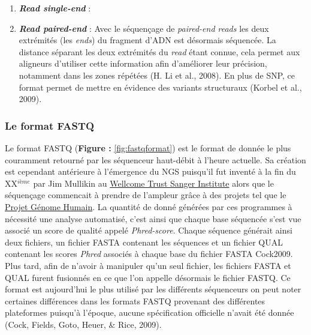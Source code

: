 \documentclass[12pt,twoside]{reedthesis}
\providecommand{\tightlist}{%
  \setlength{\itemsep}{0pt}\setlength{\parskip}{0pt}}
\theoremstyle{definition}
\theoremstyle{definition}
\theoremstyle{remark}
\begin{document}
  \begin{enumerate}
  \def\labelenumi{\arabic{enumi}.}
  \tightlist
  \item
    \textbf{\emph{Read single-end} }:\\
  \item
    \textbf{\emph{Read paired-end} }: Avec le séquençage de
    \emph{paired-end reads} les deux extrémités (les \emph{ends}) du
    fragment d'ADN est désormais séquencée. La distance séparant les deux
    extrémités du \emph{read} étant connue, cela permet aux aligneurs
    d'utiliser cette information afin d'améliorer leur précision,
    notamment dans les zones répétées (H. Li et al., 2008). En plus de
    SNP, ce format permet de mettre en évidence des variants structuraux
    (Korbel et al., 2009).
  \end{enumerate}
  
  \subsubsection{Le format FASTQ}\label{le-format-fastq}
  
  Le format FASTQ (\textbf{Figure : }\ref{fig:fastqformat}) est le format
  de donnée le plus couramment retourné par les séquenceur haut-débit à
  l'heure actuelle. Sa création est cependant antérieure à l'émergence du
  NGS puisqu'il fut inventé à la fin du XX\(^{ième}\) par Jim Mullikin au
  \href{https://fr.wikipedia.org/wiki/Wellcome_Trust_Sanger_Institute}{Wellcome
  Trust Sanger Institute} alors que le séquençage commencait à prendre de
  l'ampleur grâce à des projets tel que le
  \href{https://fr.wikipedia.org/wiki/Projet_G\%C3\%A9nome_Humain}{Projet
  Génome Humain}. La quantité de donné générées par ces programmes à
  nécessité une analyse automatisé, c'est ainsi que chaque base séquencée
  s'est vue associé un score de qualité appelé \emph{Phred-score}. Chaque
  séquence générait ainsi deux fichiers, un fichier FASTA contenant les
  séquences et un fichier QUAL contenant les scores \emph{Phred} associés
  à chaque base du fichier FASTA Cock2009. Plus tard, afin de n'avoir à
  manipuler qu'un seul fichier, les fichiers FASTA et QUAL furent
  fusionnés en ce que l'on appelle désormais le fichier FASTQ. Ce format
  est aujourd'hui le plus utilisé par les différents séquenceurs on peut
  noter certaines différences dans les formats FASTQ provenant des
  différentes plateformes puisqu'à l'époque, aucune spécification
  officielle n'avait été donnée (Cock, Fields, Goto, Heuer, \& Rice,
  2009).
  
\end{document}
